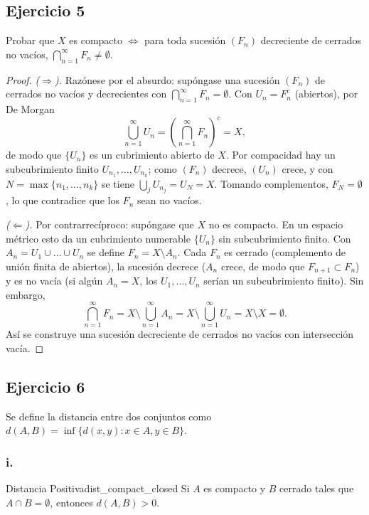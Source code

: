 \documentclass[11pt, a4paper]{article}
\begin{document}
\subsection*{Ejercicio 5}

Probar que $X$ es compacto $\iff$ para toda sucesión $(F_n)$ decreciente de cerrados no vacíos,
$\bigcap_{n=1}^{\infty} F_n \neq \emptyset$.

\begin{proof}
\textit{($\Rightarrow$).} Razónese por el absurdo: supóngase una sucesión $(F_n)$ de cerrados no
vacíos y decrecientes con $\bigcap_{n=1}^{\infty} F_n = \emptyset$. Con $U_n = F_n^c$ (abiertos), por
De Morgan
$$ \bigcup_{n=1}^{\infty} U_n = \left( \bigcap_{n=1}^{\infty} F_n \right)^c = X, $$
de modo que $\{U_n\}$ es un cubrimiento abierto de $X$. Por compacidad hay un subcubrimiento finito
$U_{n_1}, \dots, U_{n_k}$; como $(F_n)$ decrece, $(U_n)$ crece, y con $N = \max\{n_1, \dots, n_k\}$ se
tiene $\bigcup_j U_{n_j} = U_N = X$. Tomando complementos, $F_N = \emptyset$, lo que contradice que
los $F_n$ sean no vacíos.

\textit{($\Leftarrow$).} Por contrarrecíproco: supóngase que $X$ no es compacto. En un espacio
métrico esto da un cubrimiento numerable $\{U_n\}$ sin subcubrimiento finito. Con
$A_n = U_1 \cup \dots \cup U_n$ se define $F_n = X \setminus A_n$. Cada $F_n$ es cerrado (complemento
de unión finita de abiertos), la sucesión decrece ($A_n$ crece, de modo que $F_{n+1} \subset F_n$) y es
no vacía (si algún $A_n = X$, los $U_1, \dots, U_n$ serían un subcubrimiento finito). Sin embargo,
$$ \bigcap_{n=1}^{\infty} F_n = X \setminus \bigcup_{n=1}^{\infty} A_n = X \setminus
\bigcup_{n=1}^{\infty} U_n = X \setminus X = \emptyset. $$
Así se construye una sucesión decreciente de cerrados no vacíos con intersección vacía.
\end{proof}

\subsection*{Ejercicio 6}

Se define la distancia entre dos conjuntos como $d(A, B) = \inf \{ d(x, y) : x \in A, y \in B \}$.

\subsubsection*{i.}
\begin{proposicion}{Distancia Positiva}{dist_compact_closed}
Si $A$ es compacto y $B$ cerrado tales que $A \cap B = \emptyset$, entonces $d(A, B) > 0$.
\end{proposicion}
\end{document}
